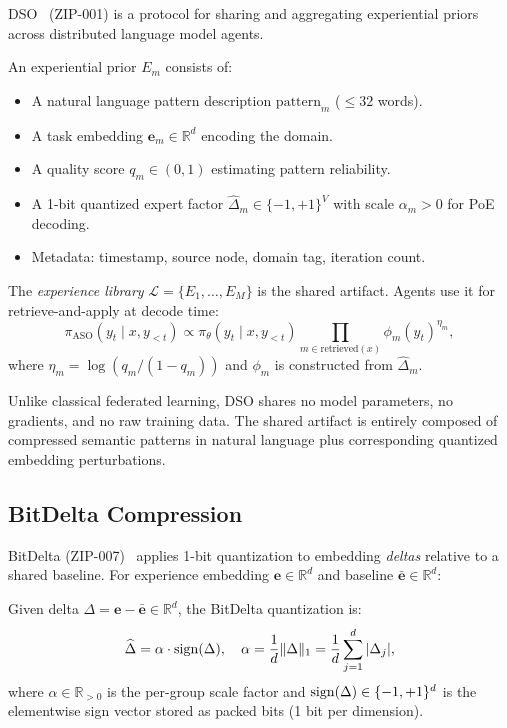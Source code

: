 DSO~\cite{hanzo2026dso} (ZIP-001) is a protocol for sharing and aggregating
experiential priors across distributed language model agents.

\begin{definition}
\label{def:prior}
An experiential prior $E_m$ consists of:
\begin{itemize}[leftmargin=1.5em]
    \item A natural language pattern description $\text{pattern}_m$ ($\leq 32$ words).
    \item A task embedding $\bm{e}_m \in \mathbb{R}^d$ encoding the domain.
    \item A quality score $q_m \in (0, 1)$ estimating pattern reliability.
    \item A 1-bit quantized expert factor $\widehat{\Delta}_m \in \{-1,+1\}^V$
          with scale $\alpha_m > 0$ for PoE decoding.
    \item Metadata: timestamp, source node, domain tag, iteration count.
\end{itemize}
\end{definition}

The \emph{experience library} $\mathcal{L} = \{E_1, \ldots, E_M\}$ is the
shared artifact. Agents use it for retrieve-and-apply at decode time:
\begin{equation}
    \pi_{\text{ASO}}(y_t \mid x, y_{<t}) \propto \pi_\theta(y_t \mid x, y_{<t})
    \prod_{m \in \text{retrieved}(x)} \phi_m(y_t)^{\eta_m},
    \label{eq:poe}
\end{equation}
where $\eta_m = \log(q_m / (1 - q_m))$ and $\phi_m$ is constructed from
$\widehat{\Delta}_m$.

Unlike classical federated learning, DSO shares no model parameters, no
gradients, and no raw training data. The shared artifact is entirely composed
of compressed semantic patterns in natural language plus corresponding
quantized embedding perturbations.

\subsection{BitDelta Compression}
\label{sec:background-bitdelta}

BitDelta (ZIP-007)~\cite{hanzo2026bitdelta} applies 1-bit quantization to
embedding \emph{deltas} relative to a shared baseline. For experience embedding
$\bm{e} \in \mathbb{R}^d$ and baseline $\bar{\bm{e}} \in \mathbb{R}^d$:

\begin{definition}
\label{def:bitdelta}
Given delta $\Delta = \bm{e} - \bar{\bm{e}} \in \mathbb{R}^d$, the BitDelta
quantization is:
\begin{equation}
    \widehat{\Delta} = \alpha \cdot \operatorname{sign}(\Delta),
    \quad \alpha = \frac{1}{d} \|\Delta\|_1 = \frac{1}{d}\sum_{j=1}^d |\Delta_j|,
    \label{eq:bitdelta}
\end{equation}
where $\alpha \in \mathbb{R}_{>0}$ is the per-group scale factor and
$\operatorname{sign}(\Delta) \in \{-1, +1\}^d$ is the elementwise sign vector stored as
packed bits (1 bit per dimension).
\end{definition}

